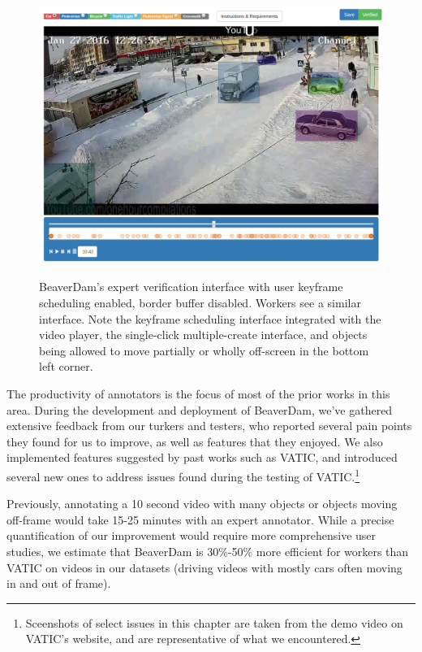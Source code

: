 \begin{figure}[h]
\includegraphics[width=15cm]{figs/interface.png}
\label{interface}
\centering
\caption{BeaverDam's expert verification interface with user keyframe scheduling enabled, border buffer disabled. Workers see a similar interface. Note the keyframe scheduling interface integrated with the video player, the single-click multiple-create interface, and objects being allowed to move partially or wholly off-screen in the bottom left corner.}
\end{figure}

The productivity of annotators is the focus of most of the prior works in this area.
During the development and deployment of BeaverDam, we've gathered extensive feedback from our turkers and testers,
who reported several pain points they found for us to improve, as well as features that they enjoyed.
We also implemented features suggested by past works such as VATIC,
and introduced several new ones to address issues found during the testing of VATIC.\footnote{Sceenshots of select issues in this chapter are taken from the demo video on VATIC's website, and are representative of what we encountered.}

Previously, annotating a 10 second video with many objects or objects moving off-frame would take 15-25 minutes with an expert annotator.
While a precise quantification of our improvement would require more comprehensive user studies, we estimate that BeaverDam is 30\%-50\% more efficient for workers than VATIC on videos in our datasets (driving videos with mostly cars often moving in and out of frame).

